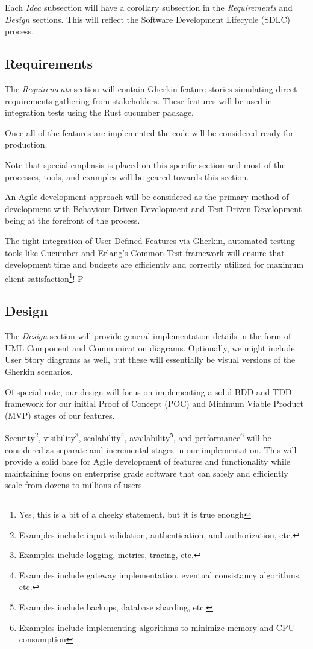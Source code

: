 \documentclass{book}
\begin{document}
Each \emph{Idea} subsection will have a corollary subsection in the \emph{Requirements}
and \emph{Design} sections.  This will reflect the Software Development Lifecycle (SDLC)
process.

\subsection{Requirements}
The \emph{Requirements} section will contain Gherkin feature stories simulating
direct requirements gathering from stakeholders.  These features will be used
in integration tests using the Rust cucumber package.

Once all of the features are implemented the code will be considered ready for 
production.

Note that special emphasis is placed on this specific section and most of the 
processes, tools, and examples will be geared towards this section.

An Agile development approach will be considered as the primary method of 
development with Behaviour Driven Development and Test Driven Development
being at the forefront of the process.

The tight integration of User Defined Features via Gherkin, automated testing
tools like Cucumber and Erlang's Common Test framework will ensure that development
time and budgets are efficiently and correctly utilized for maximum client
satisfaction\footnote{Yes, this is a bit of a cheeky statement, but it is true enough}! \:P

\subsection{Design}
The \emph{Design} section will provide general implementation details in the 
form of UML Component and Communication diagrams.  Optionally, we might include
User Story diagrams as well, but these will essentially be visual versions of 
the Gherkin scenarios.

Of special note, our design will focus on implementing a solid BDD and TDD 
framework for our initial Proof of Concept (POC) and Minimum Viable Product 
(MVP) stages of our features.

Security\footnote{Examples include input validation, authentication, and authorization, etc.}, 
visibility\footnote{Examples include logging, metrics, tracing, etc.}, 
scalability\footnote{Examples include gateway implementation, eventual consistancy algorithms, etc.}, 
availability\footnote{Examples include backups, database sharding, etc.}, and 
performance\footnote{Examples include implementing algorithms to minimize memory and CPU consumption} will be 
considered as separate and incremental stages in our implementation.
This will provide a solid base for Agile development of features and 
functionality while maintaining focus on enterprise grade software that can safely
and efficiently scale from dozens to millions of users.
\end{document}
